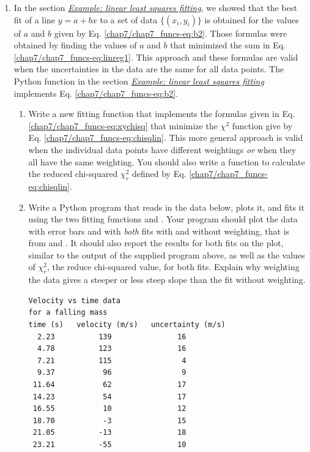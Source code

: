 \documentclass[letterpaper,10pt,english]{sphinxmanual}
\begin{document}
\begin{enumerate}
\item {} 
In the section {\hyperref[chap7/chap7_funcs:linfitfunc]{\emph{Example: linear least squares fitting}}}, we showed that the best fit of a line $y = a + bx$ to a set of data $\{(x_i,y_i)\}$ is obtained for the values of $a$ and $b$ given by Eq. \eqref{chap7/chap7_funcs-eq:b2}.  Those formulas were obtained by finding the values of $a$ and $b$ that minimized the sum in Eq. \eqref{chap7/chap7_funcs-eq:linreg1}. This approach and these formulas are valid when the uncertainties in the data are the same for all data points.  The Python function  in the section {\hyperref[chap7/chap7_funcs:linfitfunc]{\emph{Example: linear least squares fitting}}} implements Eq. \eqref{chap7/chap7_funcs-eq:b2}.
\begin{enumerate}
\item {} 
Write a new fitting function  that implements the formulas given in Eq. \eqref{chap7/chap7_funcs-eq:xychisq} that minimize the $\chi^2$ function give by Eq. \eqref{chap7/chap7_funcs-eq:chisqlin}.  This more general approach is valid when the individual data points have different weightings \emph{or} when they all have the same weighting.  You should also write a function to calculate the reduced chi-squared $\chi_r^2$ defined by Eq. \eqref{chap7/chap7_funcs-eq:chisqlin}.

\item {} 
Write a Python program that reads in the data below, plots it, and fits it using the two fitting functions   and .  Your program should plot the data with error bars and with \emph{both} fits with and without weighting, that is from  and .  It should also report the results for both fits on the plot, similar to the output of the supplied program above, as well as the values of $\chi_r^2$, the reduce chi-squared value, for both fits.  Explain why weighting the data gives a steeper or less steep slope than the fit without weighting.

\begin{Verbatim}[commandchars=\\\{\}]
Velocity vs time data
for a falling mass
time (s)   velocity (m/s)   uncertainty (m/s)
  2.23          139               16
  4.78          123               16
  7.21          115                4
  9.37           96                9
 11.64           62               17
 14.23           54               17
 16.55           10               12
 18.70           -3               15
 21.05          -13               18
 23.21          -55               10
\end{Verbatim}


\end{enumerate}
\end{enumerate}
\end{document}
